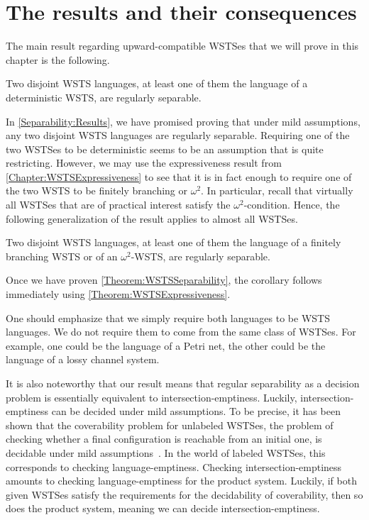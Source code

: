 \documentclass[../../diss.tex]{subfiles}
\begin{document}
\section{The results and their consequences}%
\label{Section:SeparabilityAndConsequences}%

The main result regarding upward-compatible WSTSes that we will prove in this chapter is the following.

\begin{theorem}%
\label{Theorem:WSTSSeparability}%
    Two disjoint WSTS languages, at least one of them the language of a deterministic WSTS, are regularly separable.
\end{theorem}

In \cref{Separability:Results}, we have promised proving that under mild assumptions, any two disjoint WSTS languages are regularly separable.
Requiring one of the two WSTSes to be deterministic seems to be an assumption that is quite restricting.
However, we may use the expressiveness result from \cref{Chapter:WSTSExpressiveness} to see that it is in fact enough to require one of the two WSTS to be finitely branching or $\omega^2$.
In particular, recall that virtually all WSTSes that are of practical interest satisfy the $\omega^2$-condition.
Hence, the following generalization of the result applies to almost all WSTSes.

\begin{corollary}
    Two disjoint WSTS languages, at least one of them the language of a finitely branching WSTS or of an $\omega^2$-WSTS, are regularly separable.
\end{corollary}

Once we have proven \cref{Theorem:WSTSSeparability}, the corollary follows immediately using \cref{Theorem:WSTSExpressiveness}.

One should emphasize that we simply require both languages to be WSTS languages.
We do not require them to come from the same class of WSTSes.
For example, one could be the language of a Petri net, the other could be the language of a lossy channel system.

It is also noteworthy that our result means that regular separability as a decision problem is essentially equivalent to intersection-emptiness.
Luckily, intersection-emptiness can be decided under mild assumptions.
To be precise, it has been shown that the coverability problem for unlabeled WSTSes, the problem of checking whether a final configuration is reachable from an initial one, is decidable under mild assumptions~\cite{AbdullaJ1993,GeeraertsRV06}.
In the world of labeled WSTSes, this corresponds to checking language-emptiness.
Checking intersection-emptiness amounts to checking language-emptiness for the product system.
Luckily, if both given WSTSes satisfy the requirements for the decidability of coverability, then so does the product system, meaning we can decide intersection-emptiness.
\end{document}
